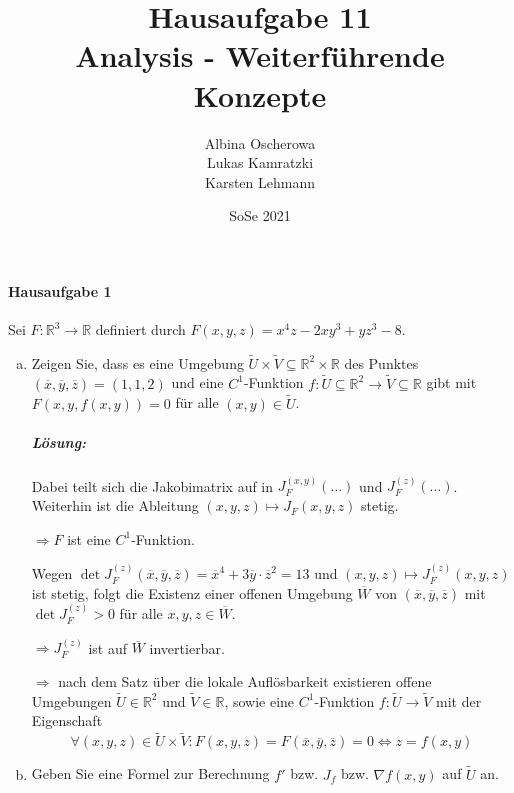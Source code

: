 \documentclass{scrreprt}
\author{Albina Oscherowa \\ Lukas Kamratzki \\ Karsten Lehmann}
\date{SoSe 2021}
\title{Hausaufgabe 11 \\Analysis - Weiterführende Konzepte}
\begin{document}
\paragraph{Hausaufgabe 1} Sei $F \colon \mathbb{R}^3 \to \mathbb{R}$
definiert durch $F(x, y, z) = x^4z - 2xy^3 + yz^3 - 8$.
\begin{enumerate}[a)]
\item Zeigen Sie, dass es eine Umgebung
  $\tilde{U} \times \tilde{V} \subseteq \mathbb{R}^2 \times \mathbb{R}$
  des Punktes $(\overline{x}, \overline{y}, \overline{z}) = (1, 1, 2)$
  und eine $C^1$-Funktion
  $f \colon \tilde{U} \subseteq \mathbb{R}^2 \to \tilde{V} \subseteq \mathbb{R}$
  gibt mit $F(x, y, f(x, y)) = 0$ für alle $(x, y) \in \tilde{U}$.

  \subparagraph{Lösung:}
  Dabei teilt sich die Jakobimatrix auf in
  \colorbox{red!40}{$J_F^{(x,y)} (\ldots)$} und
  \colorbox{blue!40}{$J_F^{(z)} (\ldots)$}.
  Weiterhin ist die Ableitung $(x, y, z) \mapsto J_F(x, y, z)$ stetig.

  $\Rightarrow F$ ist eine $C^1$-Funktion.

  Wegen
  $\det J_F^{(z)}(\overline{x}, \overline{y}, \overline{z}) =
  \overline{x}^4 + 3\overline{y} \cdot \overline{z}^2 = 13$ und
  $(x, y, z) \mapsto J_F^{(z)}(x, y, z)$ ist stetig, folgt die
  Existenz einer offenen Umgebung $\overline{W}$ von
  $(\overline{x}, \overline{y}, \overline{z})$ mit
  $\det J_F^{(z)} > 0$ für alle $x, y, z \in \overline{W}$.

  $\Rightarrow J_F^{(z)}$ ist auf $\overline{W}$ invertierbar.

  $\Rightarrow$ nach dem Satz über die lokale Auflösbarkeit existieren
  offene Umgebungen $\tilde{U} \in \mathbb{R}^2$ und $\tilde{V} \in \mathbb{R}$,
  sowie eine $C^1$-Funktion $f \colon \tilde{U} \to \tilde{V}$
  mit der Eigenschaft
  \[
    \forall (x, y, z) \in \tilde{U} \times \tilde{V} \colon
    F(x, y, z) = F(\overline{x}, \overline{y}, \overline{z}) = 0
    \iff z = f(x, y)
  \]

\item Geben Sie eine Formel zur Berechnung $f'$ bzw. $J_f$ bzw.
  $\nabla f(x, y)$ auf $\tilde{U}$ an.


\end{enumerate}
\end{document}
